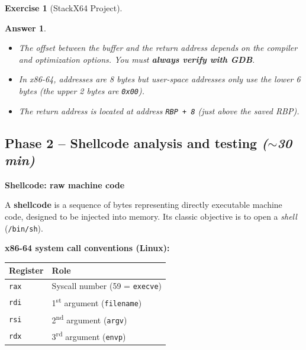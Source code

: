 \documentclass[a4paper,11pt]{article}
\theoremstyle{plain}
\newtheorem{correction}{Answer}
\theoremstyle{definition}
\newtheorem{exercice}{Exercise}
\begin{document}
\begin{exercice}[StackX64 Project]
\begin{correction}
\begin{pointcle}
\begin{itemize}
    \item The offset between the buffer and the return address depends on the compiler and optimization options. You must \textbf{always verify with GDB}.
    \item In x86-64, addresses are 8 bytes but user-space addresses only use the lower 6 bytes (the upper 2 bytes are \texttt{0x00}).
    \item The return address is located at address \texttt{RBP + 8} (just above the saved RBP).
\end{itemize}
\end{pointcle}

\end{correction}



\subsection*{Phase 2 -- Shellcode analysis and testing \hfill\normalfont\textit{($\sim$30 min)}}

\begin{rappel}
\textbf{Shellcode: raw machine code}

A \textbf{shellcode} is a sequence of bytes representing directly executable machine code, designed to be injected into memory. Its classic objective is to open a \textit{shell} (\texttt{/bin/sh}).

\medskip
\textbf{x86-64 system call conventions (Linux):}
\begin{center}
\begin{tabular}{ll}
\toprule
\textbf{Register} & \textbf{Role} \\
\midrule
\texttt{rax} & Syscall number (59 = \texttt{execve}) \\
\texttt{rdi} & 1\textsuperscript{st} argument (\texttt{filename}) \\
\texttt{rsi} & 2\textsuperscript{nd} argument (\texttt{argv}) \\
\texttt{rdx} & 3\textsuperscript{rd} argument (\texttt{envp}) \\
\bottomrule
\end{tabular}
\end{center}


\end{rappel}
\end{exercice}
\end{document}
